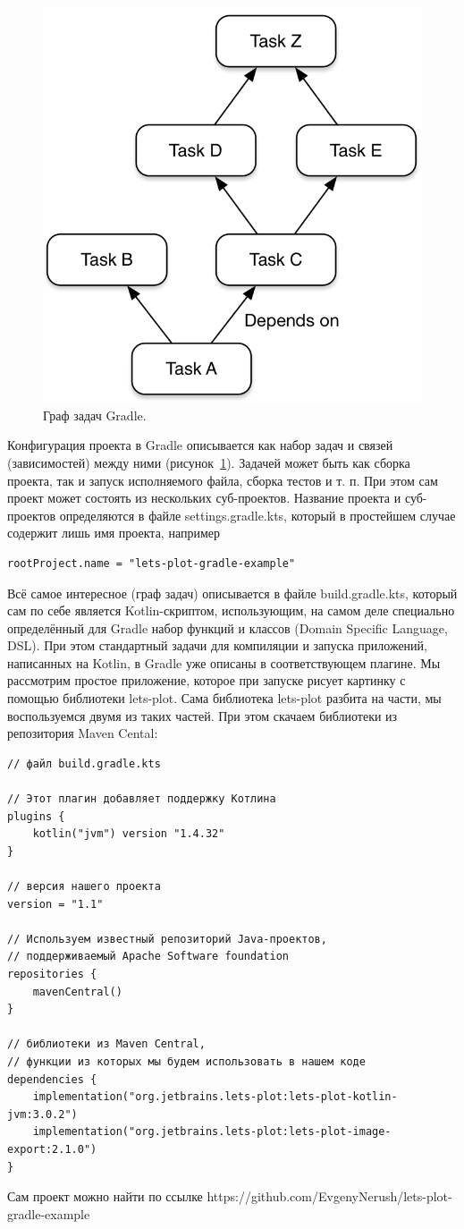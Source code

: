 \documentclass{book}
\begin{document}
\begin{figure}
    \includegraphics[width = 0.5\linewidth]{gradle_graph.png}
    \caption{\label{gradle_graph}Граф задач Gradle.}
\end{figure}

Конфигурация проекта в Gradle описывается как набор задач и связей (зависимостей) между ними
(рисунок~\ref{gradle_graph}). Задачей может быть как сборка проекта, так и запуск исполняемого
файла, сборка тестов и т. п. При этом сам проект может состоять из нескольких суб-проектов.
Название проекта и суб-проектов определяются в файле settings.gradle.kts, который в простейшем
случае содержит лишь имя проекта, например
\begin{verbatim}
rootProject.name = "lets-plot-gradle-example"
\end{verbatim}

Всё самое интересное (граф задач) описывается в файле build.gradle.kts, который сам по себе
является Kotlin-скриптом, использующим, на самом деле специально определённый для Gradle набор
функций и классов (Domain Specific Language, DSL). При этом стандартный задачи для компиляции и
запуска приложений, написанных на Kotlin, в Gradle уже описаны в соответствующем плагине.  Мы
рассмотрим простое приложение, которое при запуске рисует картинку с помощью библиотеки lets-plot.
Сама библиотека lets-plot разбита на части, мы воспользуемся двумя из таких частей. При этом
скачаем библиотеки из репозитория Maven Cental:
\begin{verbatim}
// файл build.gradle.kts

// Этот плагин добавляет поддержку Котлина
plugins {
    kotlin("jvm") version "1.4.32"
}

// версия нашего проекта
version = "1.1"

// Используем известный репозиторий Java-проектов,
// поддерживаемый Apache Software foundation
repositories {
    mavenCentral()
}

// библиотеки из Maven Central,
// функции из которых мы будем использовать в нашем коде
dependencies {
    implementation("org.jetbrains.lets-plot:lets-plot-kotlin-jvm:3.0.2")
    implementation("org.jetbrains.lets-plot:lets-plot-image-export:2.1.0")
}
\end{verbatim}
Сам проект можно найти по ссылке https://github.com/EvgenyNerush/lets-plot-gradle-example
\end{document}
